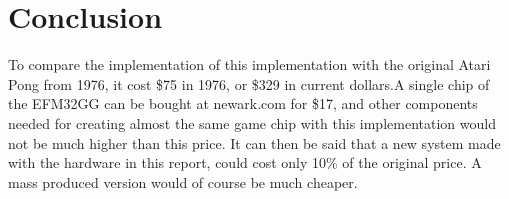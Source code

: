 \section{Conclusion}


To compare the implementation of this implementation with the original Atari
Pong from 1976, it cost \$75 in 1976\cite{pongreview}, or \$329 in current
dollars.\footnotemark A single chip of the EFM32GG can be bought at newark.com
for \$17, and other components needed for creating almost the same game chip
with this implementation would not be much higher than this price. It can then
be said that a new system made with the hardware in this report, could cost only
10\% of the original price. A mass produced version would of course be much
cheaper.

